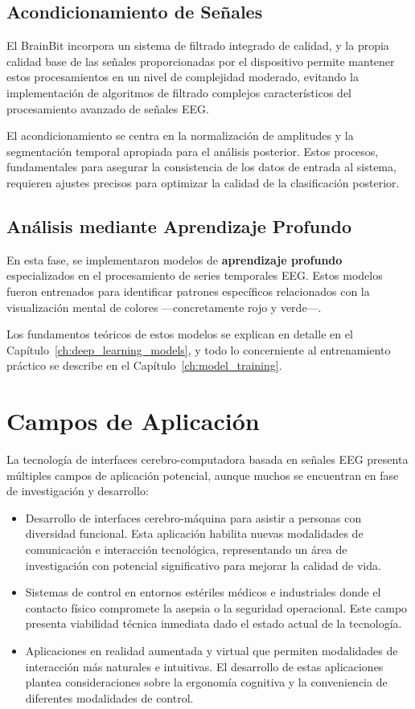     \subsection{Acondicionamiento de Señales}
    El BrainBit incorpora un sistema de filtrado integrado de calidad, y la propia calidad base de las señales proporcionadas por el dispositivo permite mantener estos procesamientos en un nivel de complejidad moderado, evitando la implementación de algoritmos de filtrado complejos característicos del procesamiento avanzado de señales EEG.
    
    El acondicionamiento se centra en la normalización de amplitudes y la segmentación temporal apropiada para el análisis posterior. Estos procesos, fundamentales para asegurar la consistencia de los datos de entrada al sistema, requieren ajustes precisos para optimizar la calidad de la clasificación posterior.

    \subsection{Análisis mediante Aprendizaje Profundo}
    En esta fase, se implementaron modelos de \textbf{aprendizaje profundo} especializados en el procesamiento de series temporales EEG. Estos modelos fueron entrenados para identificar patrones específicos relacionados con la visualización mental de colores —concretamente rojo y verde—.
    
    Los fundamentos teóricos de estos modelos se explican en detalle en el Capítulo~\ref{ch:deep_learning_models}, y todo lo concerniente al entrenamiento práctico se describe en el Capítulo~\ref{ch:model_training}.

\section{Campos de Aplicación}
La tecnología de interfaces cerebro-computadora basada en señales EEG presenta múltiples campos de aplicación potencial, aunque muchos se encuentran en fase de investigación y desarrollo:

    \begin{itemize}
        \item Desarrollo de interfaces cerebro-máquina para asistir a personas con diversidad funcional. Esta aplicación habilita nuevas modalidades de comunicación e interacción tecnológica, representando un área de investigación con potencial significativo para mejorar la calidad de vida.
        \item Sistemas de control en entornos estériles médicos e industriales donde el contacto físico compromete la asepsia o la seguridad operacional. Este campo presenta viabilidad técnica inmediata dado el estado actual de la tecnología.
        \item Aplicaciones en realidad aumentada y virtual que permiten modalidades de interacción más naturales e intuitivas. El desarrollo de estas aplicaciones plantea consideraciones sobre la ergonomía cognitiva y la conveniencia de diferentes modalidades de control.
    \end{itemize}

